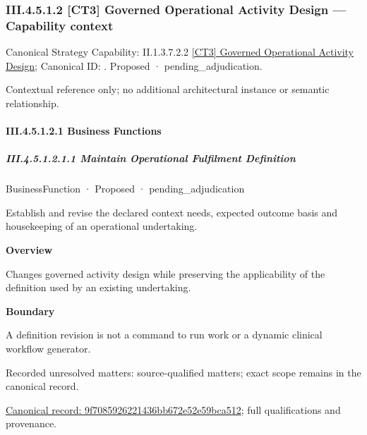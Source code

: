 \subsubsection*{III.4.5.1.2 [CT3] Governed Operational Activity Design — Capability context}
\label{navigation:III.4.5.1.2}

{\small Canonical Strategy Capability: II.1.3.7.2.2 \hyperref[element:3a96040821c14fe38830411dab4f8453]{[CT3] Governed Operational Activity Design}; Canonical ID: \texttt{}. Proposed · pending\_adjudication.}\par
Contextual reference only; no additional architectural instance or semantic relationship.\par
\paragraph*{III.4.5.1.2.1 Business Functions}
\label{navigation:III.4.5.1.2.1}

\subparagraph*{III.4.5.1.2.1.1 Maintain Operational Fulfilment Definition}
\label{navigation:III.4.5.1.2.1.1}

\label{element:9f7085926221436bb672e52e59bca512}
{\small BusinessFunction · Proposed · pending\_adjudication}\par

Establish and revise the declared context needs, expected outcome basis and housekeeping of an operational undertaking.



\textbf{Overview}



Changes governed activity design while preserving the applicability of the definition used by an existing undertaking.



\textbf{Boundary}



A definition revision is not a command to run work or a dynamic clinical workflow generator.


{\small Recorded unresolved matters: source-qualified matters; exact scope remains in the canonical record.}\par
{\footnotesize \href{../../../../../../../continuum/business/business-function/9f7085926221436bb672e52e59bca512.md}{Canonical record: 9f7085926221436bb672e52e59bca512}; full qualifications and provenance.}\par
